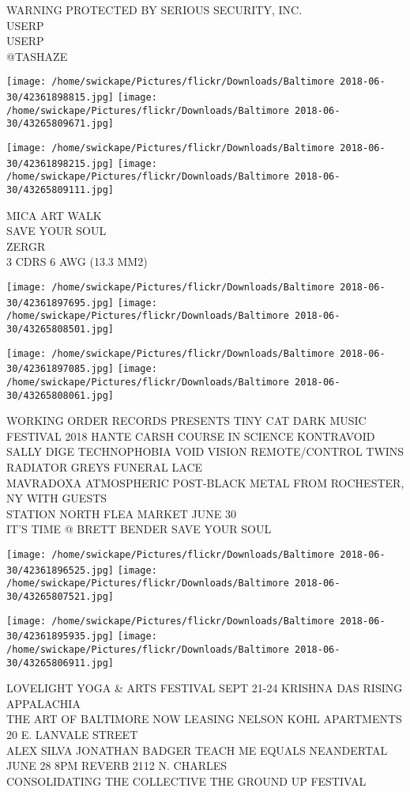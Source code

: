 \documentclass[10pt,letterpaper]{article}
\begin{document}
WARNING PROTECTED BY SERIOUS SECURITY, INC.\\
USERP\\
USERP\\
@TASHAZE
\pagebreak

\texttt{[image: /home/swickape/Pictures/flickr/Downloads/Baltimore 2018-06-30/42361898815.jpg]}
\texttt{[image: /home/swickape/Pictures/flickr/Downloads/Baltimore 2018-06-30/43265809671.jpg]}

\texttt{[image: /home/swickape/Pictures/flickr/Downloads/Baltimore 2018-06-30/42361898215.jpg]}
\texttt{[image: /home/swickape/Pictures/flickr/Downloads/Baltimore 2018-06-30/43265809111.jpg]}

MICA ART WALK\\
SAVE YOUR SOUL\\
ZERGR\\
3 CDRS 6 AWG (13.3 MM2)
\pagebreak

\texttt{[image: /home/swickape/Pictures/flickr/Downloads/Baltimore 2018-06-30/42361897695.jpg]}
\texttt{[image: /home/swickape/Pictures/flickr/Downloads/Baltimore 2018-06-30/43265808501.jpg]}

\texttt{[image: /home/swickape/Pictures/flickr/Downloads/Baltimore 2018-06-30/42361897085.jpg]}
\texttt{[image: /home/swickape/Pictures/flickr/Downloads/Baltimore 2018-06-30/43265808061.jpg]}

WORKING ORDER RECORDS PRESENTS TINY CAT DARK MUSIC FESTIVAL 2018 HANTE CARSH COURSE IN SCIENCE KONTRAVOID SALLY DIGE TECHNOPHOBIA VOID VISION REMOTE/CONTROL TWINS RADIATOR GREYS FUNERAL LACE\\
MAVRADOXA ATMOSPHERIC POST{-}BLACK METAL FROM ROCHESTER, NY WITH GUESTS\\
STATION NORTH FLEA MARKET JUNE 30\\
IT'S TIME @ BRETT BENDER SAVE YOUR SOUL
\pagebreak

\texttt{[image: /home/swickape/Pictures/flickr/Downloads/Baltimore 2018-06-30/42361896525.jpg]}
\texttt{[image: /home/swickape/Pictures/flickr/Downloads/Baltimore 2018-06-30/43265807521.jpg]}

\texttt{[image: /home/swickape/Pictures/flickr/Downloads/Baltimore 2018-06-30/42361895935.jpg]}
\texttt{[image: /home/swickape/Pictures/flickr/Downloads/Baltimore 2018-06-30/43265806911.jpg]}

LOVELIGHT YOGA \& ARTS FESTIVAL SEPT 21{-}24 KRISHNA DAS RISING APPALACHIA\\
THE ART OF BALTIMORE NOW LEASING NELSON KOHL APARTMENTS 20 E. LANVALE STREET\\
ALEX SILVA JONATHAN BADGER TEACH ME EQUALS NEANDERTAL JUNE 28 8PM REVERB 2112 N. CHARLES\\
CONSOLIDATING THE COLLECTIVE THE GROUND UP FESTIVAL
\pagebreak
\end{document}

